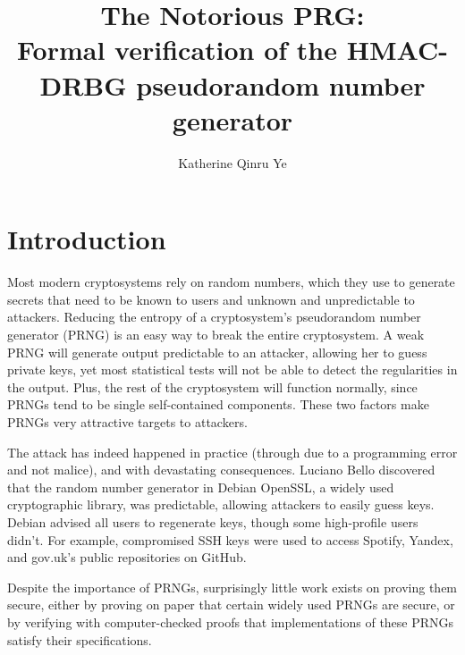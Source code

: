 \documentclass[12pt,lot, lof]{puthesis}
\title{The Notorious PRG:\\
Formal verification of the HMAC-DRBG pseudorandom number generator}
\author{Katherine Qinru Ye}
\begin{document}
\makefrontmatter



% 
% 
% 
% 
% 
% 

\chapter{Introduction}

Most modern cryptosystems rely on random numbers, which they use to generate secrets that need to be known to users and unknown and unpredictable to attackers. Reducing the entropy of a cryptosystem's pseudorandom number generator (PRNG) is an easy way to break the entire cryptosystem. A weak PRNG will generate output predictable to an attacker, allowing her to guess private keys, yet most statistical tests will not be able to detect the regularities in the output. Plus, the rest of the cryptosystem will function normally, since PRNGs tend to be single self-contained components. These two factors make PRNGs very attractive targets to attackers.

The attack has indeed happened in practice (through due to a programming error and not malice), and with devastating consequences. Luciano Bello discovered that the random number generator in Debian OpenSSL, a widely used cryptographic library, was predictable, allowing attackers to easily guess keys. Debian advised all users to regenerate keys, though some high-profile users didn't. For example, compromised SSH keys were used to access Spotify, Yandex, and gov.uk's public repositories on GitHub.

Despite the importance of PRNGs, surprisingly little work exists on proving them secure, either by proving on paper that certain widely used PRNGs are secure, or by verifying with computer-checked proofs that implementations of these PRNGs satisfy their specifications.

\end{document}
